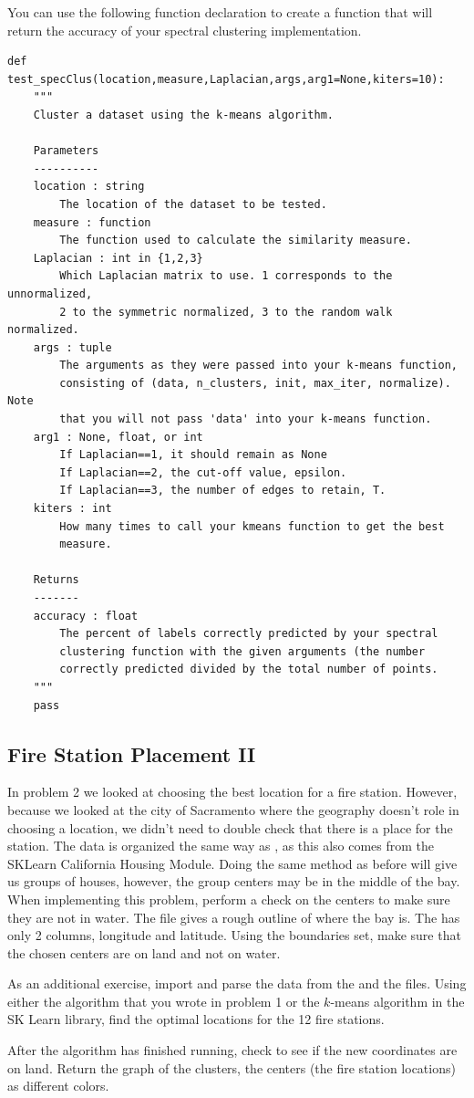 You can use the following function declaration to create a function that will return the accuracy of your spectral clustering implementation.
\begin{lstlisting}
def test_specClus(location,measure,Laplacian,args,arg1=None,kiters=10):
    """
    Cluster a dataset using the k-means algorithm.

    Parameters
    ----------
    location : string
        The location of the dataset to be tested.
    measure : function
        The function used to calculate the similarity measure.
    Laplacian : int in {1,2,3}
        Which Laplacian matrix to use. 1 corresponds to the unnormalized,
        2 to the symmetric normalized, 3 to the random walk normalized.
    args : tuple
        The arguments as they were passed into your k-means function,
        consisting of (data, n_clusters, init, max_iter, normalize). Note
        that you will not pass 'data' into your k-means function.
    arg1 : None, float, or int
        If Laplacian==1, it should remain as None
        If Laplacian==2, the cut-off value, epsilon.
        If Laplacian==3, the number of edges to retain, T.
    kiters : int
        How many times to call your kmeans function to get the best
        measure.

    Returns
    -------
    accuracy : float
        The percent of labels correctly predicted by your spectral
        clustering function with the given arguments (the number
        correctly predicted divided by the total number of points.
    """
    pass
\end{lstlisting}

\subsection*{Fire Station Placement II}
In problem 2 we looked at choosing the best location for a fire station. 
However, because we looked at the city of Sacramento where the geography doesn't role in choosing a location, we didn't need to double check that there is a place for the station.
The  data is organized the same way as , as this also comes from the SKLearn California Housing Module.
Doing the same method as before will give us groups of houses, however, the group centers may be in the middle of the bay.
When implementing this problem, perform a check on the centers to make sure they are not in water. 
The file  gives a rough outline of where the bay is.
The  has only 2 columns, longitude and latitude.
Using the boundaries set, make sure that the chosen centers are on land and not on water.

As an additional exercise, import and parse the data from the  and the  files.
Using either the algorithm that you wrote in problem 1 or the $k$-means algorithm in the SK Learn library, find the optimal locations for the 12 fire stations.
	
After the algorithm has finished running, check to see if the new coordinates are on land.
Return the graph of the clusters, the centers (the fire station locations) as different colors.
